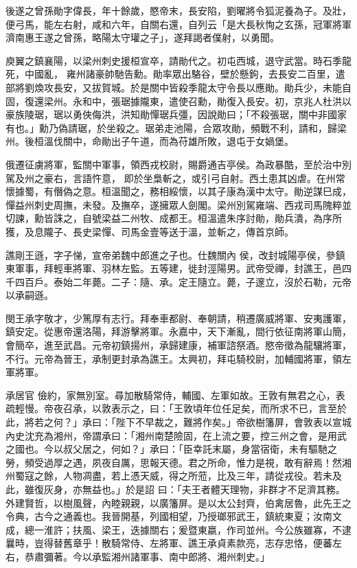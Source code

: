 \begin{pinyinscope}
 後遂之曾孫勛字偉長，年十餘歲，愍帝末，長安陷，劉曜將令狐泥養為子。及壯，便弓馬，能左右射，咸和六年，自關右還，自列云「是大長秋恂之玄孫，冠軍將軍濟南惠王遂之曾孫，略陽太守瓘之子」，遂拜謁者僕射，以勇聞。



 庾翼之鎮襄陽，以梁州刺史援桓宣卒，請勛代之。初屯西城，退守武當。時石季龍死，中國亂，
 雍州諸豪帥馳告勳。勛率眾出駱谷，壁於懸鉤，去長安二百里，遣部將劉煥攻長安，又拔賀城。於是關中皆殺季龍太守令長以應勛。勛兵少，未能自固，復還梁州。永和中，張琚據隴東，遣使召勳，勛復入長安。初，京兆人杜洪以豪族陵琚，琚以勇俠侮洪，洪知勛憚琚兵彊，因說勛曰；「不殺張琚，關中非國家有也。」勳乃偽請琚，於坐殺之。琚弟走池陽，合眾攻勛，頻戰不利，請和，歸梁州。後桓溫伐關中，命勛出子午道，而為苻雄所敗，退屯于女媧堡。



 俄遷征虜將軍，監關中軍事，領西戎校尉，賜爵通吉亭侯。為政暴酷，至於治中別駕及州之豪右，言語忤意，
 即於坐梟斬之，或引弓自射。西土患其凶虐。在州常懷據蜀，有僭偽之意。桓溫聞之，務相綏懷，以其子康為漢中太守。勛逆謀巳成，憚益州刺史周撫，未發。及撫卒，遂擁眾人劍閣。梁州別駕雍端、西戎司馬隗粹並切諫，勳皆誅之，自號梁益二州牧、成都王。桓溫遣朱序討勛，勛兵潰，為序所獲，及息隴子、長史梁憚、司馬金壹等送于溫，並斬之，傳首京師。



 譙剛王遜，字子悌，宣帝弟魏中郎進之子也。仕魏關內
 侯，改封城陽亭侯，參鎮東軍事，拜輕車將軍、羽林左監。五等建，徙封涇陽男。武帝受禪，封譙王，邑四千四百戶。泰始二年薨。二子：隨、承。定王隨立。薨，子邃立，沒於石勒，元帝以承嗣遜。



 閔王承字敬才，少篤厚有志行。拜奉車都尉、奉朝請，稍遷廣威將軍、安夷護軍，鎮安定。從惠帝還洛陽，拜游擊將軍。永嘉中，天下漸亂，間行依征南將軍山簡，會簡卒，進至武昌。元帝初鎮揚州，承歸建康，補軍諮祭酒。愍帝徵為龍驤將軍，不行。元帝為晉王，承制更封承為譙王。太興初，拜屯騎校尉，加輔國將軍，領左軍將軍。



 承居官
 儉約，家無別室。尋加散騎常侍，輔國、左軍如故。王敦有無君之心，表疏輕慢。帝夜召承，以敦表示之，曰：「王敦頃年位任足矣，而所求不已，言至於此，將若之何？」承曰：「陛下不早裁之，難將作矣。」帝欲樹籓屏，會敦表以宣城內史沈充為湘州，帝謂承曰：「湘州南楚險固，在上流之要，控三州之會，是用武之國也。今以叔父居之，何如？」承曰：「臣幸託末屬，身當宿衛，未有驅馳之勞，頻受過厚之遇，夙夜自厲，思報天德。君之所命，惟力是視，敢有辭焉！然湘州蜀寇之餘，人物凋盡，若上憑天威，得之所蒞，比及三年，請從戎役。若未及此，雖復灰身，亦無益也。」於是詔
 曰：「夫王者體天理物，非群才不足濟其務。外建賢哲，以樹風聲，內睦親親，以廣籓屏。是以太公封齊，伯禽居魯，此先王之令典，古今之通義也。我晉開基，列國相望，乃授瑯邪武王，鎮統東夏；汝南文成，總一淮許；扶風、梁王，迭據關右；爰暨東嬴，作司並州。今公族雖寡，不逮曩時，豈得替舊章乎！散騎常侍、左將軍、譙王承貞素款亮，志存忠恪，便蕃左右，恭肅彌著。今以承監湘州諸軍事、南中郎將、湘州刺史。」




\end{pinyinscope}
